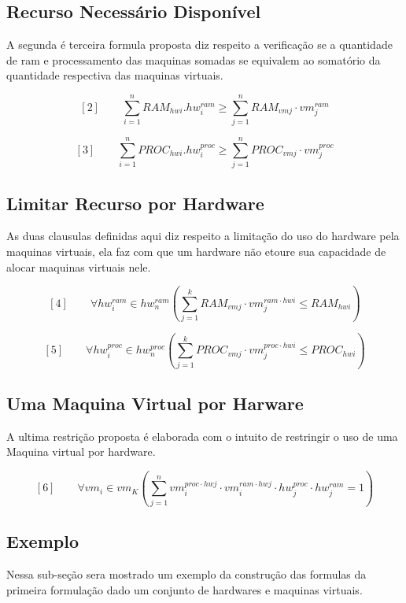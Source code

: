  \subsection{Recurso Necessário Disponível}
 
 A segunda é terceira formula proposta diz respeito a verificação se a quantidade de ram e processamento das maquinas somadas se equivalem ao somatório da quantidade respectiva das maquinas virtuais. 

 $$[2] \qquad \sum_{i=1}^{n} RAM_{hwi} . hw_{i}^{ram} \geq \sum_{j=1}^{n} RAM_{vmj} \cdot vm_{j}^{ram} $$	


 $$[3] \qquad  \sum_{i=1}^{n} PROC_{hwi} . hw_{i}^{proc} \geq \sum_{j=1}^{n} PROC_{vmj} \cdot vm_{j}^{proc} $$	
 
 
 \subsection{Limitar Recurso por Hardware}

As duas clausulas definidas aqui diz respeito a limitação do uso do hardware pela maquinas virtuais, ela faz com que um hardware não etoure sua capacidade de alocar maquinas virtuais nele.  
 
 $$[4] \qquad \forall hw_{i}^{ram} \in hw_{n}^{ram} (\sum_{j = 1}^{k}  RAM_{vmj}
\cdot vm^{ram \cdot hwi}_{j} \leq RAM_{hwi})  $$

 $$ [5] \qquad  \forall hw_{i}^{proc} \in hw_{n}^{proc} (\sum_{j = 1}^{k}  PROC_{vmj}
\cdot vm^{proc \cdot hwi}_{j} \leq PROC_{hwi})  $$


\subsection{Uma Maquina Virtual por Harware}

A ultima restrição proposta é elaborada com o intuito de restringir o uso de uma Maquina virtual por hardware.

$$[6] \qquad \forall vm_{i} \in vm_{K} (\sum_{j = 1}^{n} vm_i^{proc \cdot hwj} \cdot vm_{i}^{ram \cdot hwj} \cdot hw_{j}^{proc} \cdot hw_{j}^{ram} = 1) $$
  
\subsection{Exemplo}

Nessa sub-seção sera mostrado um exemplo da construção das formulas da primeira formulação dado um conjunto de hardwares e maquinas virtuais.

